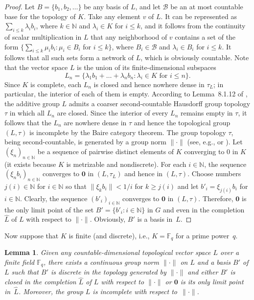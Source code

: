 \documentclass[a4paper]{amsart}
\newtheorem{lemma}{Lemma}
\theoremstyle{definition}
\let\le\leqslant
\let\ge\geqslant
\begin{document}
\begin{proof}
Let $B=\{b_1, b_2, \dots\}$ be any basis of $L$, and let $\mathscr B$ be an at most countable base for the 
topology of $K$. Take any element $v$ of $L$. It can be represented as $\sum_{i\le k} \lambda_i b_i$, where $k\in 
\mathbb N$ and $\lambda_i\in K$ for $i\le k$, and it follows from the continuity of scalar multiplication in $L$ 
that any neighborhood of $v$ contains a set of the form 
$\bigl\{\sum_{i\le k} \mu_i b_i: \mu_i\in B_i$ for $i\le k\bigr\}$,
where $B_i\in \mathscr B$ and $\lambda_i\in B_i$ for $i\le k$. It follows that all such sets form a network of $L$, which 
is obviously countable. Note that the vector space $L$ is the union of its finite-dimensional subspaces 
$$
L_n=\{\lambda_1 b_1 + \dots +\lambda_n b_n: \lambda_i \in K \text{ for }i\le n\}.
$$ 
Since $K$ is complete, 
 each $L_n$ is closed \cite[Sec.~I.2.3, Corollary~1]{Bourbaki} and hence nowhere dense \cite[Sec.~I.2.1]{Bourbaki} 
in $\tau_L$; in particular, the interior of each of them is empty. According to Lemma~8.1.12 of \cite{AT}, 
the additive group $L$ admits a coarser second-countable Hausdorff group topology $\tau$ in which all $L_n$ are 
closed. Since the interior of every $L_n$ remains empty in $\tau$, it follows that the $L_n$ are nowhere dense in 
$\tau$ and hence the topological group $(L,\tau)$ is incomplete by the Baire category theorem. The group topology 
$\tau$, being second-countable, is generated by a group norm $\lVert\boldsymbol\cdot\rVert$ (see, e.g., 
\cite{Graev50} or \cite[Corollary~3.3.13]{AT}). Let $(\xi_n)_{n\in\mathbb N}$ be a sequence  of pairwise distinct 
elements of $K$ converging to $0$ in $K$ (it exists because $K$ is metrizable and nondiscrete). For each $i\in \mathbb N$, 
the sequence $(\xi_n b_i)_{n\in \mathbb N}$ converges to $\mathbf 0$ in $(L,\tau_L)$ and hence in $(L,\tau)$. 
Choose numbers $j(i)\in \mathbb N$ for $i\in \mathbb N$ so 
that $\|\xi_k b_i\|<1/i$ for $k\ge j(i)$ and let $b'_i= \xi_{j(i)} b_i$ for $i\in \mathbb N$. Clearly, the 
sequence $(b'_i)_{i\in \mathbb N}$ converges to $\mathbf 0$ in $(L,\tau)$. Therefore, $\mathbf 0$ 
is the only limit point of the set $B'=\{b'_i: i\in \mathbb N\}$ in $G$ and even in the completion $\widehat L$ 
of $L$ with respect to $\lVert\boldsymbol\cdot\rVert$. Obviously, $B'$ is a basis in~$L$. 
\end{proof}

Now suppose that $K$ is finite (and discrete), i.e., $K=\mathbb F_q$ for a prime 
power~$q$. 

\begin{lemma}
\label{l2}
Given any countable-dimensional topological vector space $L$ over a finite field $\mathbb F_q$, 
there exists a continuous group norm $\lVert\boldsymbol\cdot\rVert$ on $L$ and a basis $B'$ 
of $L$ such that $B'$ is discrete in the topology generated by $\lVert\boldsymbol\cdot\rVert$ and either $B'$ 
is closed in the completion $\widehat L$ of $L$ with respect to $\lVert\boldsymbol\cdot\rVert$ or $\mathbf 0$ is its 
only limit point in~$\widehat L$. Moreover, the group $L$ is incomplete with respect 
to~$\lVert\boldsymbol\cdot\rVert$. 
\end{lemma}
\end{document}
